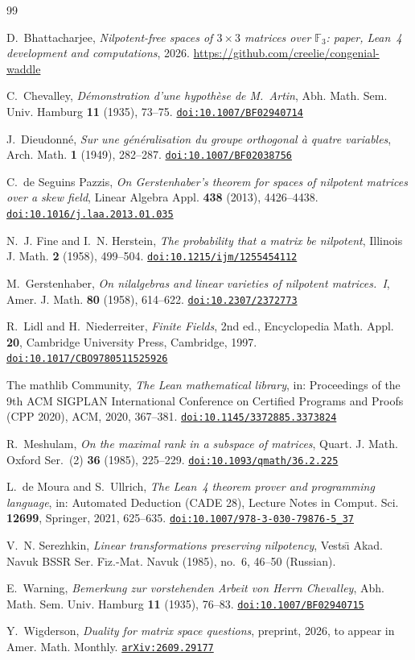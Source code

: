 \documentclass[11pt]{amsart}
\theoremstyle{definition}
\theoremstyle{remark}
\numberwithin{equation}{section}
\newcommand{\F}{\mathbb{F}}
\newcommand{\doi}[1]{\href{https://doi.org/#1}{\nolinkurl{doi:#1}}}
\begin{document}
\begin{thebibliography}{99}

D.~Bhattacharjee, \emph{Nilpotent-free spaces of $3\times3$ matrices over $\F_3$: paper, Lean~4 development and computations}, 2026. \url{https://github.com/creelie/congenial-waddle}

C.~Chevalley, \emph{D\'emonstration d'une hypoth\`ese de M.~Artin}, Abh. Math. Sem. Univ. Hamburg \textbf{11} (1935), 73--75. \doi{10.1007/BF02940714}

J.~Dieudonn\'e, \emph{Sur une g\'en\'eralisation du groupe orthogonal \`a quatre variables}, Arch. Math. \textbf{1} (1949), 282--287. \doi{10.1007/BF02038756}

C.~de Seguins Pazzis, \emph{On Gerstenhaber's theorem for spaces of nilpotent matrices over a skew field}, Linear Algebra Appl. \textbf{438} (2013), 4426--4438. \doi{10.1016/j.laa.2013.01.035}

N.~J. Fine and I.~N. Herstein, \emph{The probability that a matrix be nilpotent}, Illinois J. Math. \textbf{2} (1958), 499--504. \doi{10.1215/ijm/1255454112}

M.~Gerstenhaber, \emph{On nilalgebras and linear varieties of nilpotent matrices.~I}, Amer. J. Math. \textbf{80} (1958), 614--622. \doi{10.2307/2372773}

R.~Lidl and H.~Niederreiter, \emph{Finite Fields}, 2nd ed., Encyclopedia Math. Appl. \textbf{20}, Cambridge University Press, Cambridge, 1997. \doi{10.1017/CBO9780511525926}

The mathlib Community, \emph{The Lean mathematical library}, in: Proceedings of the 9th ACM SIGPLAN International Conference on Certified Programs and Proofs (CPP 2020), ACM, 2020, 367--381. \doi{10.1145/3372885.3373824}

R.~Meshulam, \emph{On the maximal rank in a subspace of matrices}, Quart. J. Math. Oxford Ser.~(2) \textbf{36} (1985), 225--229. \doi{10.1093/qmath/36.2.225}

L.~de Moura and S.~Ullrich, \emph{The Lean~4 theorem prover and programming language}, in: Automated Deduction (CADE 28), Lecture Notes in Comput. Sci. \textbf{12699}, Springer, 2021, 625--635. \doi{10.1007/978-3-030-79876-5_37}

V.~N. Serezhkin, \emph{Linear transformations preserving nilpotency}, Vests\={\i} Akad. Navuk BSSR Ser. F\={\i}z.-Mat. Navuk (1985), no.~6, 46--50 (Russian).

E.~Warning, \emph{Bemerkung zur vorstehenden Arbeit von Herrn Chevalley}, Abh. Math. Sem. Univ. Hamburg \textbf{11} (1935), 76--83. \doi{10.1007/BF02940715}

Y.~Wigderson, \emph{Duality for matrix space questions}, preprint, 2026, to appear in Amer. Math. Monthly. \href{https://arxiv.org/abs/2609.29177}{\nolinkurl{arXiv:2609.29177}}

\end{thebibliography}
\end{document}

